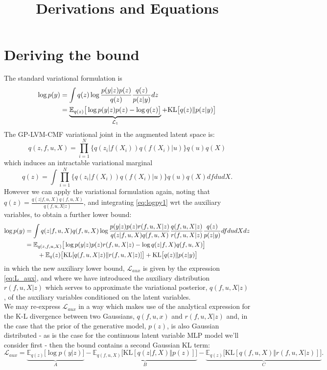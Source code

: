 \documentclass[12pt]{article}
\title{\textbf{Derivations and Equations}}
\date{}
\begin{document}
\maketitle


\section{Deriving the bound} %
\label{sec:derive_bound}
The standard variational formulation is
%
\begin{align}
    \log p(y) &= \int q(z)\log\frac{p(y|z)p(z)}{q(z)}\frac{q(z)}{p(z|y)} dz\notag\\
    &= \underbrace{\mathbb{E}_{q(z)}\big[ \log p(y|z)p(z) - \log q(z) \big]}_{\mathcal{L}_1} + \text{KL}\big[ q(z)\Vert p(z|y) \big]\label{eq:logpy1}
\end{align}
%
The GP-LVM-CMF variational joint in the augmented latent space is:
%
\begin{equation}
    q(z,f,u,X) = \prod_{i=1}^N \{q(z_i|f(X_i))q(f(X_i)|u)\}q(u)q(X)
\end{equation}
%
which induces an intractable variational marginal
%
\begin{equation}
    q(z) = \int \prod_{i=1}^N \{q(z_i|f(X_i))q(f(X_i)|u)\}q(u)q(X) df du dX.
\end{equation}
%
However we can apply the variational formulation again, noting that $q(z) = \frac{q(z|f,u,X)q(f,u,X)}{q(f,u,X|z)}$, and integrating \ref{eq:logpy1} wrt the auxiliary variables, to obtain a further lower bound:
\begin{align}
    \log p(y) &= \int q(z|f,u,X)q(f,u,X)\log \frac{p(y|z)p(z)r(f,u,X|z)}{q(z|f,u,X)q(f,u,X)}\frac{q(f,u,X|z)}{r(f,u,X|z)}\frac{q(z)}{p(z|y)} df du dX dz\notag\\
    &= \mathbb{E}_{q(z,f,u,X)}\big[ \log p(y|z)p(z)r(f,u,X|z) - \log q(z|f,X)q(f,u,X) \big]\label{eq:L_aux}\\
    &\qquad+ \mathbb{E}_q(z)\big[ \text{KL}[q(f,u,X|z)\Vert r(f,u,X|z)] \big] + \text{KL}\big[ q(z)\Vert p(z|y) \big]
\end{align}
%
in which the new auxiliary lower bound, $\mathcal{L}_{aux}$ is given by the expression \ref{eq:L_aux}, and where we have introduced the auxiliary distribution $r(f,u,X|z)$ which serves to approximate the variational posterior, $q(f,u,X|z)$, of the auxiliary variables conditioned on the latent variables.\\
We may re-express $\mathcal{L}_{aux}$ in a way which makes use of the analytical expression for the K-L divergence between two Gaussians, $q(f,u,x)$ and $r(f,u,X|z)$ and, in the case that the prior of the generative model, $p(z)$, is also Gaussian distributed - as is the case for the continuous latent variable MLP model we'll consider first - then the bound contains a second Gaussian KL term:
%
\begin{equation}
    \mathcal{L}_{aux} = \underbrace{\mathbb{E}_{q(z)}\big[ \log p(y|z) \big]}_{A} - \underbrace{\mathbb{E}_{q(f,u,X)}\big[ \text{KL}[q(z|f,X)\Vert p(z)] \big]}_{B} - \underbrace{\mathbb{E}_{q(z)}\big[ \text{KL}[q(f,u,X)\Vert r(f,u,X|z)] \big]}_{C}.
\end{equation}
%
%
\end{document}
